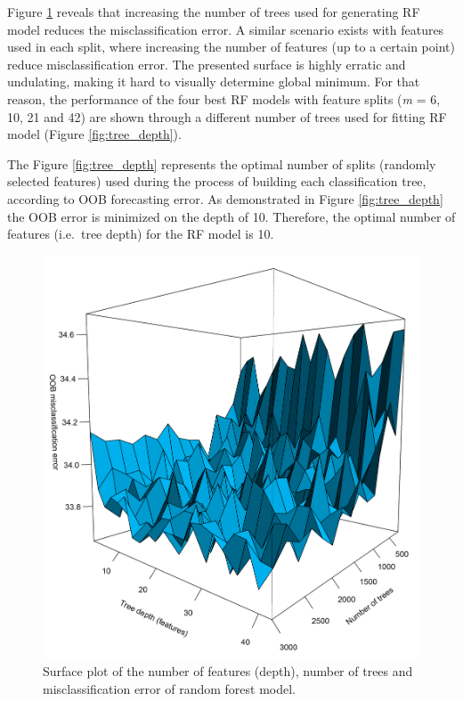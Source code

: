 \documentclass[preprint, 3p,
authoryear]{elsarticle} %
\begin{document}
Figure \ref{fig:surface} reveals that increasing the number of trees
used for generating RF model reduces the misclassification error. A
similar scenario exists with features used in each split, where
increasing the number of features (up to a certain point) reduce
misclassification error. The presented surface is highly erratic and
undulating, making it hard to visually determine global minimum. For
that reason, the performance of the four best RF models with feature
splits (\emph{m} = 6, 10, 21 and 42) are shown through a different
number of trees used for fitting RF model (Figure \ref{fig:tree_depth}).

The Figure \ref{fig:tree_depth} represents the optimal number of splits
(randomly selected features) used during the process of building each
classification tree, according to OOB forecasting error. As demonstrated
in Figure \ref{fig:tree_depth} the OOB error is minimized on the depth
of 10. Therefore, the optimal number of features (i.e.~tree depth) for
the RF model is 10.

\begin{figure}[H]

{\centering \includegraphics[width=0.7\linewidth]{img/300dpi/Fig_persp} 

}

\caption{Surface plot of the number of features (depth), number of trees and misclassification error of random forest model.}\label{fig:surface}
\end{figure}
\end{document}
